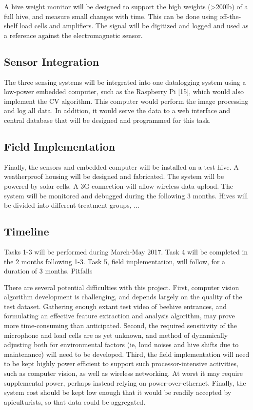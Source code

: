 A hive weight monitor will be designed to support the high weights (>200lb) of a full hive, and measure small changes with time. This can be done using off-the-shelf load cells and amplifiers. The signal will be digitized and logged and used as a reference against the electromagnetic sensor.

\subsection{Sensor Integration}

The three sensing systems will be integrated into one datalogging system using a low-power embedded computer, such as the Raspberry Pi [15], which would also implement the CV algorithm. This computer would perform the image processing and log all data. In addition, it would serve the data to a web interface and central database that will be designed and programmed for this task. 

\subsection{Field Implementation}

Finally, the sensors and embedded computer will be installed on a test hive. A weatherproof housing will be designed and fabricated.  The system will be powered by solar cells. A 3G connection will allow wireless data upload. The system will be monitored and debugged during the following 3 months. Hives will be divided into different treatment groups, ...

\subsection{Timeline}

Tasks 1-3 will be performed during March-May 2017. Task 4 will be completed in the 2 months following 1-3. Task 5, field implementation, will follow, for a duration of 3 months.
Pitfalls

There are several potential difficulties with this project. First, computer vision algorithm development is challenging, and depends largely on the quality of the test dataset. Gathering enough extant test video of beehive entrances, and formulating an effective feature extraction and analysis algorithm, may prove more time-consuming than anticipated. Second, the required sensitivity of the microphone and load cells are as yet unknown, and method of dynamically adjusting both for environmental factors (ie, loud noises and hive shifts due to maintenance) will need to be developed. Third, the field implementation will need to be kept highly power efficient to support such processor-intensive activities, such as computer vision, as well as wireless networking. At worst it may require  supplemental power, perhaps instead relying on power-over-ethernet. Finally, the system cost should be kept low enough that it would be readily accepted by apiculturists, so that data could be aggregated.
